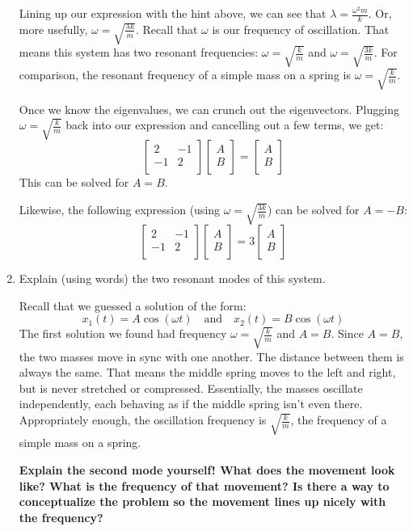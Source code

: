 \documentclass[12pt]{article}
\newcommand{\purple}[1]{{\color{purple} #1}}
\begin{document}
\begin{enumerate}
\purple{
Lining up our expression with the hint above, we can see that $\lambda = \frac{\omega^2 m}{k}$. Or, more usefully, $\omega = \sqrt{\frac{\lambda k}{m}}$. Recall that $\omega$ is our frequency of oscillation. That means this system has two resonant frequencies: $\omega = \sqrt{\frac{k}{m}}$ and $\omega = \sqrt{\frac{3k}{m}}$. For comparison, the resonant frequency of a simple mass on a spring is $\omega = \sqrt{\frac{k}{m}}$.

Once we know the eigenvalues, we can crunch out the eigenvectors. Plugging $\omega = \sqrt{\frac{k}{m}}$ back into our expression and cancelling out a few terms, we get:
$$
\left[
{\begin{array}{cc}
   2 & -1\\
   -1 & 2\\
  \end{array} }
\right]
\left[
{\begin{array}{c}
   A\\
   B\\
  \end{array} }
\right]
 = 
 \left[
{\begin{array}{c}
   A\\
   B\\
  \end{array} }
\right]
$$
This can be solved for $A = B$.

Likewise, the following expression (using $\omega = \sqrt{\frac{3k}{m}}$) can be solved for $A = -B$:
$$
\left[
{\begin{array}{cc}
   2 & -1\\
   -1 & 2\\
  \end{array} }
\right]
\left[
{\begin{array}{c}
   A\\
   B\\
  \end{array} }
\right]
 = 
 3
 \left[
{\begin{array}{c}
   A\\
   B\\
  \end{array} }
\right]
$$
}
\item Explain (using words) the two resonant modes of this system.

\purple{
Recall that we guessed a solution of the form:
$$
x_1(t) = A\cos \left( \omega t \right)
\quad\text{and}\quad
x_2(t) = B\cos \left( \omega t \right)
$$
The first solution we found had frequency $\omega = \sqrt{\frac{k}{m}}$ and $A = B$. Since $A = B$, the two masses move in sync with one another. The distance between them is always the same. That means the middle spring moves to the left and right, but is never stretched or compressed. Essentially, the masses oscillate independently, each behaving as if the middle spring isn't even there. Appropriately enough, the oscillation frequency is $\sqrt{\frac{k}{m}}$, the frequency of a simple mass on a spring. 

\textbf{Explain the second mode yourself! What does the movement look like? What is the frequency of that movement? Is there a way to conceptualize the problem so the movement lines up nicely with the frequency?}
}

\end{enumerate}
\end{document}
